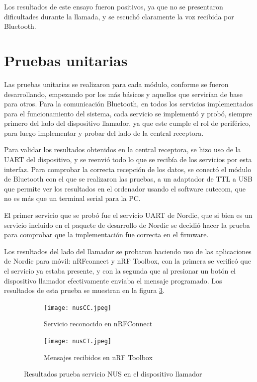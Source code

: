 Los resultados de este ensayo fueron positivos, ya que no se presentaron dificultades durante la llamada, y se escuchó claramente la voz recibida por Bluetooth.

\section{Pruebas unitarias}
\label{sec:pruebasUN}

Las pruebas unitarias se realizaron para cada módulo, conforme se fueron desarrollando, empezando por los más básicos y aquellos que servirían de base para otros.
Para la comunicación Bluetooth, en todos los servicios implementados para el funcionamiento del sistema, cada servicio se implementó y probó, siempre primero del lado del dispositivo llamador, ya que este cumple el rol de periférico, para luego implementar y probar del lado de la central receptora.

Para validar los resultados obtenidos en la central receptora, se hizo uso de la UART del dispositivo, y se reenvió todo lo que se recibía de los servicios por esta interfaz. Para comprobar la correcta recepción de los datos, se conectó el módulo de Bluetooth con el que se realizaron las pruebas, a un adaptador de TTL a USB que permite ver los resultados en el ordenador usando el software cutecom, que no es más que un terminal serial para la PC.

El primer servicio que se probó fue el servicio UART de Nordic, que si bien es un servicio incluido en el paquete de desarrollo de Nordic se decidió hacer la prueba para comprobar que la implementación fue correcta en el firmware. 

Los resultados del lado del llamador se probaron haciendo uso de las aplicaciones de Nordic para móvil: nRFconnect y nRF Toolbox, con la primera se verificó que el servicio ya estaba presente, y con la segunda que al presionar un botón el dispositivo llamador efectivamente enviaba el mensaje programado. Los resultados de esta prueba se muestran en la figura \ref{fig:Pnus}.

\begin{figure}[htpb]
	\centering
   	\begin{subfigure}[b]{0.5\textwidth}
   		\centering
      	\texttt{[image: nusCC.jpeg]}
      	\caption{Servicio reconocido en nRFConnect}
      	\label{fig:PnusA}
   	\end{subfigure}%
   	\begin{subfigure}[b]{0.5\textwidth}
   		\centering
      	\texttt{[image: nusCT.jpeg]}
      	\caption{Mensajes recibidos en nRF Toolbox}
      	\label{fig:PnusB}
   	\end{subfigure}%
	\caption{Resultados prueba servicio NUS en el dispositivo llamador}
	\label{fig:Pnus}
\end{figure}

